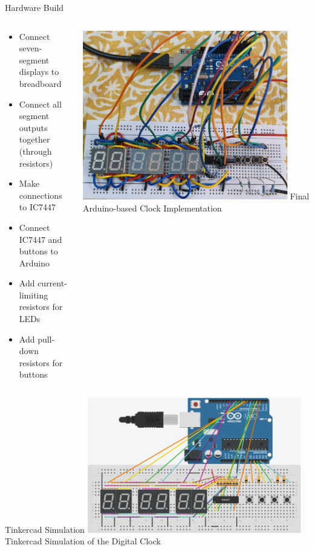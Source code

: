 \documentclass{beamer}
\begin{document}
\begin{frame}{Hardware Build}
    \begin{columns}
        \begin{column}{0.6\textwidth}
            \begin{itemize}
                \item Connect seven-segment displays to breadboard
                \item Connect all segment outputs together (through resistors)
                \item Make connections to IC7447
                \item Connect IC7447 and buttons to Arduino
                \item Add current-limiting resistors for LEDs
                \item Add pull-down resistors for buttons
            \end{itemize}
        \end{column}
        \begin{column}{0.4\textwidth}
            \centering
            \includegraphics[width=0.9\textwidth]{figs/clock.jpg}
            \scriptsize Final Arduino-based Clock Implementation
        \end{column}
    \end{columns}
\end{frame}

\begin{frame}{Tinkercad Simulation}
    \centering
    \includegraphics[width=0.7\textwidth]{figs/Clock_Tinkercad.png}
    \scriptsize Tinkercad Simulation of the Digital Clock
\end{frame}
\end{document}

